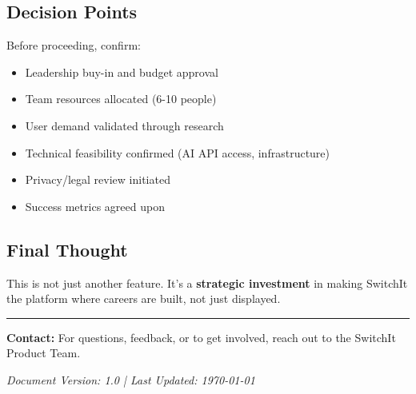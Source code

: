 \documentclass[12pt,a4paper]{article}
\begin{document}
\subsection{Decision Points}

Before proceeding, confirm:

\begin{itemize}
    \item[\checkmark] Leadership buy-in and budget approval
    \item[\checkmark] Team resources allocated (6-10 people)
    \item[\checkmark] User demand validated through research
    \item[\checkmark] Technical feasibility confirmed (AI API access, infrastructure)
    \item[\checkmark] Privacy/legal review initiated
    \item[\checkmark] Success metrics agreed upon
\end{itemize}

\subsection{Final Thought}

\begin{center}
\end{center}

\vspace{1cm}

This is not just another feature. It's a \textbf{strategic investment} in making SwitchIt the platform where careers are built, not just displayed.

\vspace{0.5cm}
\hrule
\vspace{0.5cm}

\noindent\textbf{Contact:} For questions, feedback, or to get involved, reach out to the SwitchIt Product Team.

\vspace{0.3cm}

\noindent\textit{Document Version: 1.0 | Last Updated: \today}
\end{document}
